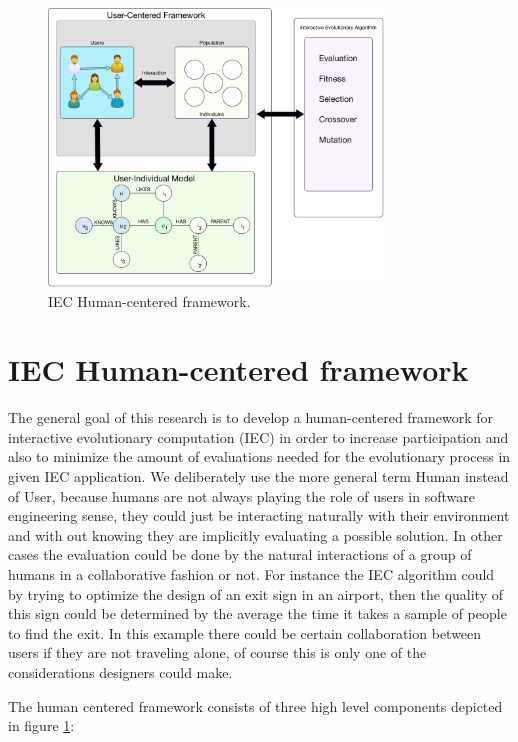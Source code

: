 \documentclass[conference]{IEEEtran}
\begin{document}
\begin{figure}[!t]
    \centering
        \includegraphics[width=3.5in]{img/framework.png}
    \caption{IEC Human-centered framework.}
    \label{fig:uc_framework}
\end{figure}


 \section{IEC Human-centered framework}
\label{sec:graph}
The general goal of this research is to develop a human-centered \cite{gasson2003human} framework
for interactive evolutionary computation (IEC) in order to increase
participation and also to minimize the amount of evaluations needed for the
evolutionary process in given IEC application. We deliberately use the 
more general
term Human instead of User, because humans are not always playing the role of
users in software engineering sense, they could just be interacting 
naturally with their environment and with out knowing they are implicitly
evaluating a possible solution. In other cases the evaluation could be done
by the natural interactions of a group of humans in a collaborative fashion
or not. For instance the IEC algorithm could by trying to optimize 
the design of an exit sign in an airport, then the quality of this sign could be
determined by the average the time it takes a sample of people to 
find the exit. In this example there could be certain collaboration
between users if they are not traveling alone, of course this is only one of
the considerations designers could make. 


The human centered framework consists of three high level components depicted
in figure \ref{fig:uc_framework}:
\end{document}
